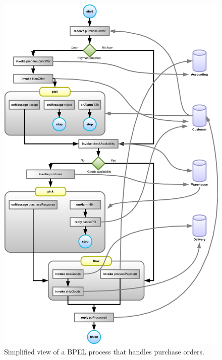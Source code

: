 \begin{figure}[tbhp]
    \centering
    \includegraphics[height=\textheight]{content/sample-usecase/bpel-process}
    \caption{Simplified view of a BPEL process that handles purchase orders.}
    \label{fig:bpel-process}
\end{figure}

